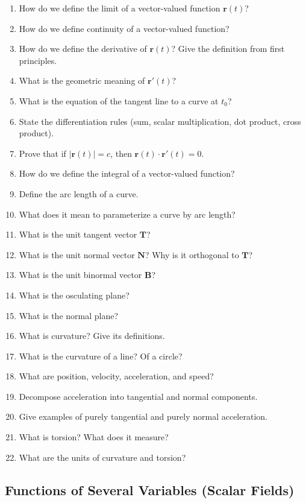 \begin{enumerate}[resume]
  \item How do we define the limit of a vector-valued function $\mathbf{r}(t)$?
  \item How do we define continuity of a vector-valued function?
  \item How do we define the derivative of $\mathbf{r}(t)$? Give the definition from first principles.
  \item What is the geometric meaning of $\mathbf{r}'(t)$?
  \item What is the equation of the tangent line to a curve at $t_0$?
  \item State the differentiation rules (sum, scalar multiplication, dot product, cross product).
  \item Prove that if $|\mathbf{r}(t)| = c$, then $\mathbf{r}(t) \cdot \mathbf{r}'(t) = 0$.
  \item How do we define the integral of a vector-valued function?
  \item Define the arc length of a curve.
  \item What does it mean to parameterize a curve by arc length?
  \item What is the unit tangent vector $\mathbf{T}$?
  \item What is the unit normal vector $\mathbf{N}$? Why is it orthogonal to $\mathbf{T}$?
  \item What is the unit binormal vector $\mathbf{B}$?
  \item What is the osculating plane?
  \item What is the normal plane?
  \item What is curvature? Give its definitions.
  \item What is the curvature of a line? Of a circle?
  \item What are position, velocity, acceleration, and speed?
  \item Decompose acceleration into tangential and normal components.
  \item Give examples of purely tangential and purely normal acceleration.
  \item What is torsion? What does it measure?
  \item What are the units of curvature and torsion?
\end{enumerate}

\subsection{Functions of Several Variables (Scalar Fields)}


